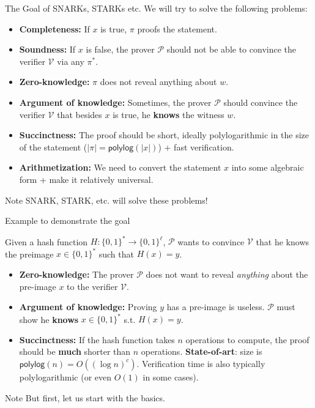\documentclass{zkdl-presentation-template}
\begin{document}
    \begin{frame}{The Goal of SNARKs, STARKs etc.}
        We will try to solve the following problems:
        \begin{itemize}
            \item \textbf{Completeness:} If $x$ is true, $\pi$ proofs the statement.\pause
            \item \textbf{Soundness:} If $x$ is false, the prover $\mathcal{P}$ should not be able to convince the verifier $\mathcal{V}$ via any $\pi^*$.\pause
            \item \textbf{Zero-knowledge:} $\pi$ does not reveal anything about $w$.\pause
            \item \textbf{Argument of knowledge:} Sometimes, the prover $\mathcal{P}$ should convince the verifier $\mathcal{V}$ that besides $x$ is true, he \textbf{knows} the witness $w$.\pause
            \item \textbf{Succinctness:} The proof should be short, ideally polylogarithmic in the size of the statement ($|\pi| = \mathsf{polylog}(|x|)$) + fast verification.\pause
            \item \textbf{Arithmetization:} We need to convert the statement $x$ into some algebraic form + make it relatively universal.\pause
        \end{itemize}

        \begin{alertblock}{Note}
            SNARK, STARK, etc. will solve these problems!
        \end{alertblock}
    \end{frame}

    \begin{frame}{Example to demonstrate the goal}
        \begin{example}
            Given a hash function $H: \{0,1\}^* \to \{0,1\}^{\ell}$, $\mathcal{P}$ wants to convince $\mathcal{V}$ that he knows the preimage $x \in \{0,1\}^*$ such that $H(x) = y$.\pause
            \begin{itemize}
                \item \textbf{Zero-knowledge:} The prover $\mathcal{P}$ does not want to reveal \textit{anything} about the pre-image $x$ to the verifier $\mathcal{V}$.\pause
                \item \textbf{Argument of knowledge:} Proving $y$ has a pre-image is useless. $\mathcal{P}$ must show he \textbf{knows} $x \in \{0,1\}^*$ s.t. $H(x)=y$.\pause
                \item \textbf{Succinctness:} If the hash function takes $n$ operations to compute, the proof should be \textbf{much} shorter than $n$ operations. \textbf{State-of-art}: size is $\mathsf{polylog}(n) = O((\log n)^c)$. Verification time is also typically polylogarithmic (or even $O(1)$ in some cases).\pause
            \end{itemize}
        \end{example}

        \begin{block}{Note}
            But first, let us start with the basics.
        \end{block}
    \end{frame}
\end{document}
